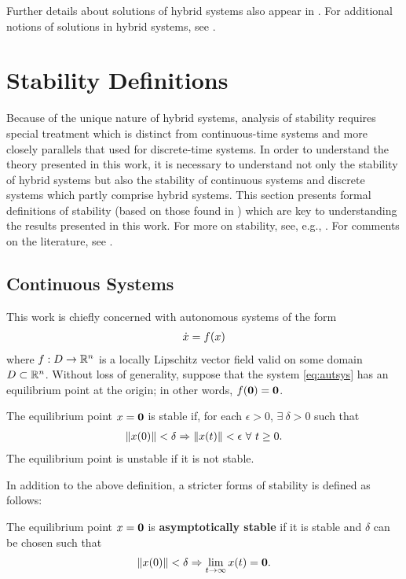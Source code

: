 Further details about solutions of hybrid systems also appear in
.
%
For additional notions of solutions in hybrid systems, see \cite{Filippov1988,
  Goebel2009, Haddad2001, Lygeros2003, Ye1998}.


\section{Stability Definitions} \label{sec:hsys-stability}

Because of the unique nature of hybrid systems, analysis of stability requires
special treatment which is distinct from continuous-time systems and more
closely parallels that used for discrete-time systems.
%
In order to understand the theory presented in this work, it is necessary to
understand not only the stability of hybrid systems but also the stability of
continuous systems and discrete systems which partly comprise hybrid systems.
%
This section presents formal definitions of stability (based on
those found in \cite[Ch. 4]{Khalil2002}) which are key to understanding the
results presented in this work.
%
For more on stability, see, e.g., \cite{Khalil2002, Teschl2012,
  Vidyasagar1993}.
%
For comments on the literature, see .


\subsection{Continuous Systems}

This work is chiefly concerned with autonomous systems of the form
\begin{align}
  \label{eq:autsys}
  {\dot {x}} = f(x)
\end{align}
where $f : D \to \mathbb{R}^{n}$ is a locally Lipschitz vector field valid on some
domain $D \subset \mathbb{R}^{n}$.
%
Without loss of generality, suppose that the system \eqref{eq:autsys} has an
equilibrium point at the origin;
%
in other words, $f({\mathbf 0}) = {\mathbf 0}$.
%
\begin{definition}
  The equilibrium point $x = {\mathbf 0}$ is stable if, for each $\epsilon > 0$,
  $\exists \ \delta > 0$ such that
  \begin{align*}
    \|x(0)\| < \delta \Rightarrow \|x(t)\| < \epsilon \ \forall \ t
    \geq 0.
  \end{align*}
  The equilibrium point is unstable if it is not stable.
\end{definition}

In addition to the above definition, a stricter forms of stability is defined as
follows:
%
\begin{definition}
  The equilibrium point $x = {\mathbf 0}$ is {\bf asymptotically stable} if it is
  stable and $\delta$ can be chosen such that
  \begin{align*}
    \|x(0)\| < \delta \Rightarrow \lim_{t \to \infty} x(t) = {\mathbf 0}.
  \end{align*}
\end{definition}

